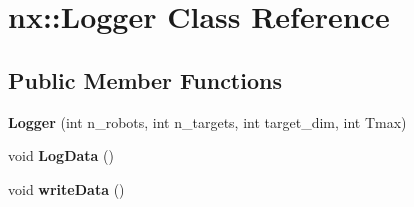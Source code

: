 \hypertarget{classnx_1_1Logger}{}\section{nx\+:\+:Logger Class Reference}
\label{classnx_1_1Logger}
\subsection*{Public Member Functions}
\begin{DoxyCompactItemize}
\item 
\mbox{\label{classnx_1_1Logger_a639bf5ba9ecd1ead5cc27ff67af557e8}} 
{\bfseries Logger} (int n\+\_\+robots, int n\+\_\+targets, int target\+\_\+dim, int Tmax)
\item 
\mbox{\label{classnx_1_1Logger_a8ab63781a718f2866798fae568b226d1}} 
void {\bfseries Log\+Data} ()
\item 
\mbox{\label{classnx_1_1Logger_ac85aeb9fb5a7dac9dc498403b4b9d4ca}} 
void {\bfseries write\+Data} ()
\end{DoxyCompactItemize}
